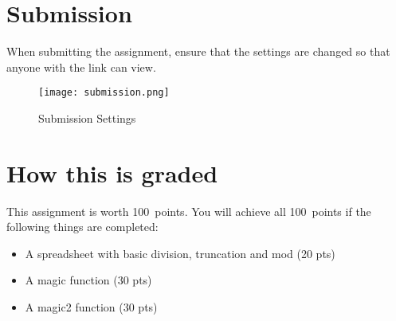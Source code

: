 \documentclass{article}
\newcommand{\AValue}{100}
\begin{document}
\section*{Submission}
When submitting the assignment, ensure that the settings are changed so that anyone with the link can view.
\begin{figure}[H]
  \centering
  \texttt{[image: submission.png]}
  \caption{Submission Settings}
\end{figure}

\section*{How this is graded}
This assignment is worth \AValue \ points. You will achieve all \AValue \   points if the following things are completed:
\begin{itemize}
    \item A spreadsheet with basic division, truncation and mod (20 pts)
    \item A magic function (30 pts)
    \item A magic2 function (30 pts)
\end{itemize}
\end{document}
